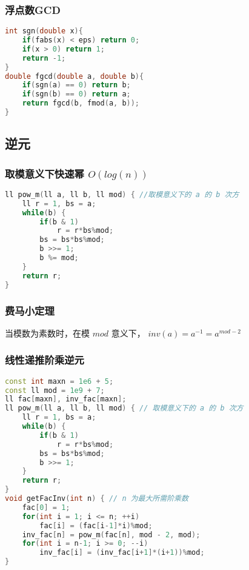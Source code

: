 \subsubsection{浮点数GCD}

\begin{lstlisting}[language=C++]
int sgn(double x){
    if(fabs(x) < eps) return 0;
    if(x > 0) return 1;
    return -1;
}
double fgcd(double a, double b){
    if(sgn(a) == 0) return b;
    if(sgn(b) == 0) return a;
    return fgcd(b, fmod(a, b));
}
\end{lstlisting}

\subsection{逆元}

\subsubsection{取模意义下快速幂 $O(log(n))$}

\begin{lstlisting}[language=C++]
ll pow_m(ll a, ll b, ll mod) { //取模意义下的 a 的 b 次方
    ll r = 1, bs = a;
    while(b) {
        if(b & 1)
            r = r*bs%mod;
        bs = bs*bs%mod;
        b >>= 1;
        b %= mod;
    }
    return r;
}
\end{lstlisting}

\subsubsection{费马小定理}

当模数为素数时，在模 $mod$ 意义下， $inv(a) = a^{-1} = a^{mod - 2}$

\subsubsection{线性递推阶乘逆元}

\begin{lstlisting}[language=C++]
const int maxn = 1e6 + 5;
const ll mod = 1e9 + 7;
ll fac[maxn], inv_fac[maxn];
ll pow_m(ll a, ll b, ll mod) { // 取模意义下的 a 的 b 次方
    ll r = 1, bs = a;
    while(b) {
        if(b & 1)
            r = r*bs%mod;
        bs = bs*bs%mod;
        b >>= 1;
    }
    return r;
}
void getFacInv(int n) { // n 为最大所需阶乘数
    fac[0] = 1;
    for(int i = 1; i <= n; ++i)
        fac[i] = (fac[i-1]*i)%mod;
    inv_fac[n] = pow_m(fac[n], mod - 2, mod);
    for(int i = n-1; i >= 0; --i)
        inv_fac[i] = (inv_fac[i+1]*(i+1))%mod;
}
\end{lstlisting}

